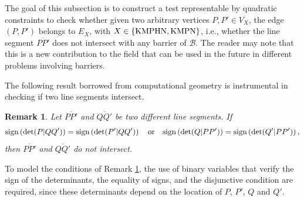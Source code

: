 \documentclass[a4paper,  review, authoryear, 1p.]{elsarticle}
\newcommand{\EB}{{E^{}_{\mathcal B}}}
\newcommand{\EBint}{{E^{int}_{\mathcal B}}}
\newcommand{\VX}{{V^{}_X}}
\newcommand{\EX}{{E^{}_X}}
\newcommand{\VKMPHN}{{V_{\text{KMPHN}}}}
\newcommand{\VKMPN}{{V_{\text{KMPN}}}}
\newtheorem{remark}{Remark}
\newcommand{\JP}[1]{{\color{blue}#1}}
\newcommand{\CV}[1]{{\color{blue}#1}}
\newcommand{\determinant}[3]{\det({#1|#2#3})}
\begin{document}
	\JP{The goal of this subsection is to construct  a test representable by quadratic constraints to check whether given two arbitrary vertices $P, P'\in \VX$, the edge $(P, P')$ \CV{belongs to} $\EX$, with $X\in\{\rm KMPHN, \rm KMPN\}$, i.e., whether the line segment $\overline{PP'}$ does not intersect with any barrier of $\mathcal B$.  The reader may note that this is a new contribution to the field that can be used in the future in different problems involving barriers.
	
	The following result borrowed from computational geometry is instrumental in checking if two line segments intersect. }
	
	\begin{remark}\label{rem:determinants}
		Let $\overline{PP'}$ and $\overline{QQ'}$ be two different line segments. 
		If
		\begin{equation*}
			\normalfont{\text{sign}}\left(\determinant{P}{Q}{Q'}\right) = \normalfont{\text{sign}}\left(\determinant{P'}{Q}{Q'}\right)
			\quad
			\text{or}
			\quad
			\normalfont{\text{sign}}\left(\determinant{Q}{P}{P'}\right) = \normalfont{\text{sign}}\left(\determinant{Q'}{P}{P'}\right)
			,
		\end{equation*}
		then $\overline{PP'}$ and $\overline{QQ'}$ do not intersect.
	\end{remark}
	
	
	
	
	
	To model the conditions of Remark \ref{rem:determinants}, the use of binary variables that verify the sign of the determinants, the equality of signs, and the disjunctive condition are required, since these determinants depend on the location of $P$, $P'$, $Q$ and $Q'$.
	
\end{document}

